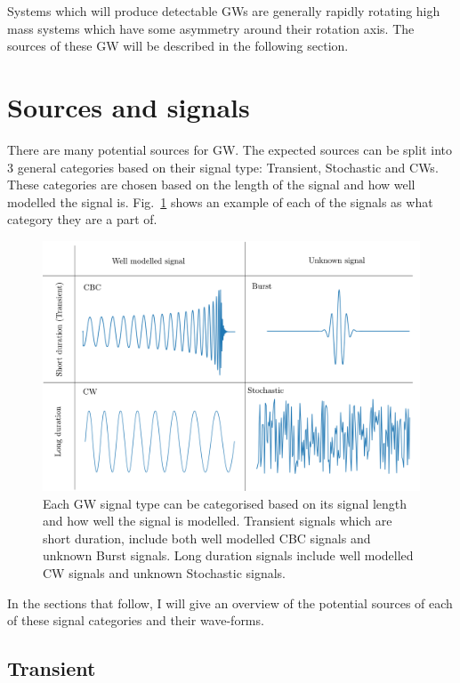 Systems which will produce detectable \acp{GW} are generally rapidly rotating high mass systems which have some asymmetry around their rotation axis.
The sources of these \ac{GW} will be described in the following section.



\section{\label{intro:sources}Sources and signals}

There are many potential sources for \ac{GW}. The expected sources can be split into 3 general categories based on their signal type: Transient, Stochastic and \acp{CW}.
These categories are chosen based on the length of the signal and how well modelled the signal is.
Fig.~\ref{intro:sources:signaltypes} shows an example of each of the signals as what category they are a part of.
%
\begin{figure}[h]
    \centering
    \includegraphics[width=\textwidth]{C1_Introduction/sources_types.pdf}
    \caption{Each \ac{GW} signal type can be categorised based on its signal length and how well the signal is modelled. Transient signals which are short duration, include both well modelled \ac{CBC} signals and unknown Burst signals. Long duration signals include well modelled \ac{CW} signals and unknown Stochastic signals.}
    \label{intro:sources:signaltypes}
\end{figure}
In the sections that follow, I will give an overview of the potential sources of each of these signal categories and their wave-forms.


\subsection{\label{sources:transient} Transient}

